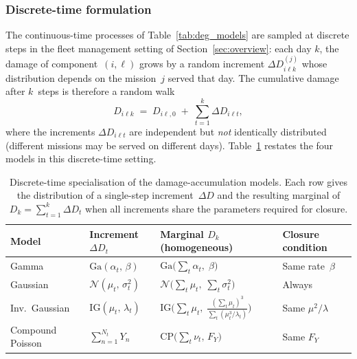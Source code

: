 \documentclass[11pt,a4paper]{article}
\theoremstyle{plain}
\theoremstyle{definition}
\theoremstyle{remark}
\begin{document}
\subsubsection{Discrete-time formulation}
\label{sec:discrete_deg}

The continuous-time processes of Table~\ref{tab:deg_models} are sampled at discrete steps in the fleet management setting of Section~\ref{sec:overview}: each day $k$, the damage of component~$(i,\ell)$ grows by a random increment $\Delta D_{i\ell k}^{(j)}$ whose distribution depends on the mission~$j$ served that day.
The cumulative damage after $k$~steps is therefore a random walk
\begin{equation}\label{eq:discrete_damage}
  D_{i\ell k} \;=\; D_{i\ell,0} \;+\; \sum_{t=1}^{k} \Delta D_{i\ell t},
\end{equation}
where the increments $\Delta D_{i\ell t}$ are independent but \emph{not} identically distributed (different missions may be served on different days).
Table~\ref{tab:discrete_models} restates the four models in this discrete-time setting.

\begin{table}[htbp]
\centering
\caption{Discrete-time specialisation of the damage-accumulation models.
Each row gives the distribution of a single-step increment~$\Delta D$ and the resulting marginal of $D_k = \sum_{t=1}^{k}\Delta D_t$ when all increments share the parameters required for closure.}
\label{tab:discrete_models}
\small
\begin{tabular}{@{}p{2.1cm}p{3.4cm}p{4.0cm}p{4.2cm}@{}}
\toprule
\textbf{Model} & \textbf{Increment} $\Delta D_t$ & \textbf{Marginal} $D_k$ (homogeneous) & \textbf{Closure condition} \\
\midrule
Gamma
  & $\mathrm{Ga}(\alpha_t,\,\beta)$
  & $\mathrm{Ga}\!\bigl(\sum_{t}\alpha_t,\;\beta\bigr)$
  & Same rate~$\beta$ \\[4pt]
Gaussian
  & $\mathcal{N}(\mu_t,\,\sigma_t^2)$
  & $\mathcal{N}\!\bigl(\sum_{t}\mu_t,\;\sum_{t}\sigma_t^2\bigr)$
  & Always \\[4pt]
Inv.\ Gaussian
  & $\mathrm{IG}(\mu_t,\,\lambda_t)$
  & $\mathrm{IG}\!\bigl(\sum_{t}\mu_t,\;\frac{(\sum_t \mu_t)^3}{ \sum_t(\mu_t^3/\lambda_t)}\bigr)$
  & Same $\mu^2/\lambda$ \\[4pt]
Compound Poisson
  & $\sum_{n=1}^{N_t} Y_n$
  & $\mathrm{CP}\!\bigl(\sum_t\nu_t,\,F_Y\bigr)$
  & Same $F_Y$ \\
\bottomrule
\end{tabular}
\end{table}
\end{document}
